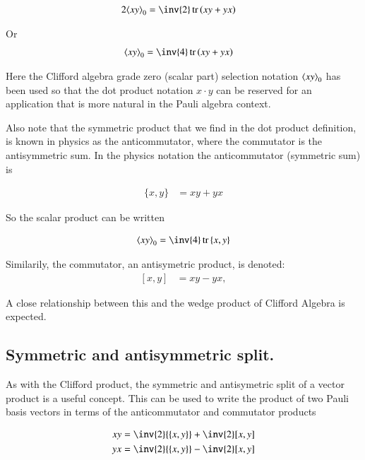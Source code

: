 \documentclass{article}
\DeclareMathOperator{\tr}{tr}
\newcommand{\trace}[1]{\tr{#1}}
\newcommand{\traceB}[1]{\tr\left({#1}\right)}
\newcommand{\symmetric}[2]{{\{{#1},{#2}\}}}
\newcommand{\antisymmetric}[2]{[{#1},{#2}]}
\begin{document}
\begin{align*}
2 \gpgradezero{x y} &= \inv{2}\traceB{x y + y x}
\end{align*}

Or
\begin{align}
\gpgradezero{x y} &= \inv{4}\traceB{x y + y x}
\end{align}

Here the Clifford algebra grade zero (scalar part) selection notation ${\left\langle{{x y}}\right\rangle}_{0}$ has been used so that the dot product notation $x \cdot y$ can be reserved for an application that is more natural in the Pauli algebra context.

Also note that the symmetric product that we find in the dot product definition, is known in physics as the anticommutator, where the commutator
is the antisymmetric sum.  In the physics notation the anticommutator (symmetric sum) is

\begin{align}\label{eqn:anticommutator}
\symmetric{x}{y} &= x y + y x
\end{align}

So the scalar product can be written

\begin{align}
\gpgradezero{ x y } = \inv{4}\trace{\symmetric{x}{y}}
\end{align}

Similarily, the commutator, an antisymetric product, is denoted:
\begin{align}\label{eqn:commutator}
\antisymmetric{x}{y} &= x y - y x,
\end{align}

A close relationship between this and the wedge product of Clifford Algebra is
expected.

\subsection{ Symmetric and antisymmetric split. }

As with the Clifford product, the symmetric and antisymetric split of a vector
product is a useful concept.  This can be used to write the product 
of two Pauli basis vectors in terms of the anticommutator and commutator 
products

\begin{align}
x y &= \inv{2} \symmetric{x}{y} + \inv{2} \antisymmetric{x}{y} \\
y x &= \inv{2} \symmetric{x}{y} - \inv{2} \antisymmetric{x}{y}
\end{align}
\end{document}
